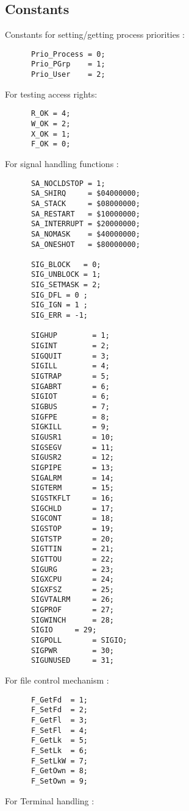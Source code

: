 %
\subsection{Constants}
Constants for setting/getting process priorities :
\begin{verbatim}
      Prio_Process = 0;
      Prio_PGrp    = 1;
      Prio_User    = 2;
\end{verbatim}
For testing  access rights:
\begin{verbatim}
      R_OK = 4; 
      W_OK = 2;
      X_OK = 1;
      F_OK = 0;
\end{verbatim}
For signal handling functions :
\begin{verbatim}
      SA_NOCLDSTOP = 1;
      SA_SHIRQ	   = $04000000;
      SA_STACK	   = $08000000;      
      SA_RESTART   = $10000000;
      SA_INTERRUPT = $20000000;
      SA_NOMASK	   = $40000000;
      SA_ONESHOT   = $80000000;
      
      SIG_BLOCK	  = 0;
      SIG_UNBLOCK = 1;
      SIG_SETMASK = 2;
      SIG_DFL = 0 ;
      SIG_IGN = 1 ;
      SIG_ERR = -1;
      
      SIGHUP		= 1;
      SIGINT		= 2;
      SIGQUIT		= 3;
      SIGILL		= 4;
      SIGTRAP		= 5;
      SIGABRT		= 6;
      SIGIOT		= 6;
      SIGBUS		= 7;
      SIGFPE		= 8;
      SIGKILL		= 9;
      SIGUSR1		= 10;
      SIGSEGV		= 11;
      SIGUSR2		= 12;
      SIGPIPE		= 13;
      SIGALRM		= 14;
      SIGTERM		= 15;
      SIGSTKFLT		= 16;
      SIGCHLD		= 17;
      SIGCONT		= 18;
      SIGSTOP		= 19;
      SIGTSTP		= 20;
      SIGTTIN		= 21;
      SIGTTOU		= 22;
      SIGURG		= 23;
      SIGXCPU		= 24;
      SIGXFSZ		= 25;
      SIGVTALRM		= 26;
      SIGPROF		= 27;
      SIGWINCH		= 28;
      SIGIO		= 29;
      SIGPOLL		= SIGIO;
      SIGPWR		= 30;
      SIGUNUSED		= 31;
\end{verbatim}
For file control mechanism :
\begin{verbatim}
      F_GetFd  = 1;
      F_SetFd  = 2;
      F_GetFl  = 3;
      F_SetFl  = 4;
      F_GetLk  = 5;
      F_SetLk  = 6;
      F_SetLkW = 7;
      F_GetOwn = 8;
      F_SetOwn = 9;
\end{verbatim}
For Terminal handling :
